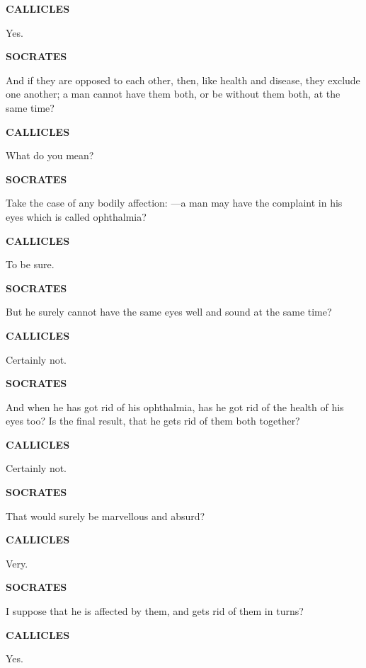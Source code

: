 \documentclass[11pt,letter]{article}
\begin{document}
\par \textbf{CALLICLES}
\par   Yes.

\par \textbf{SOCRATES}
\par   And if they are opposed to each other, then, like health and disease, they exclude one another; a man cannot have them both, or be without them both, at the same time?

\par \textbf{CALLICLES}
\par   What do you mean?

\par \textbf{SOCRATES}
\par   Take the case of any bodily affection: —a man may have the complaint in his eyes which is called ophthalmia?

\par \textbf{CALLICLES}
\par   To be sure.

\par \textbf{SOCRATES}
\par   But he surely cannot have the same eyes well and sound at the same time?

\par \textbf{CALLICLES}
\par   Certainly not.

\par \textbf{SOCRATES}
\par   And when he has got rid of his ophthalmia, has he got rid of the health of his eyes too? Is the final result, that he gets rid of them both together?

\par \textbf{CALLICLES}
\par   Certainly not.

\par \textbf{SOCRATES}
\par   That would surely be marvellous and absurd?

\par \textbf{CALLICLES}
\par   Very.

\par \textbf{SOCRATES}
\par   I suppose that he is affected by them, and gets rid of them in turns?

\par \textbf{CALLICLES}
\par   Yes.
\end{document}
